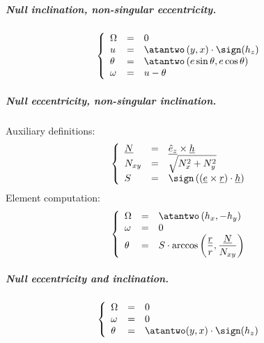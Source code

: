 		\subparagraph{ Null inclination, non-singular eccentricity. \\}
		\[
		\left\{
		\begin{array}{lll}
		\Omega 	& = & 0 \\
		u 		& = & \atantwo\left( y, x \right) \cdot \sign (h_z) \\
		\theta 	& = & \atantwo\left(e\sin\theta, e\cos\theta\right)\\
		\omega 	& = & u - \theta
		\end{array}\right.
		\]
		\subparagraph{ Null eccentricity, non-singular inclination. \\}
		\indent Auxiliary definitions:
		\[\left\{
		\begin{array}{lll}
		\underline{N} 	& = & \underline{\hat{e}_z} \times \underline{h} \\
		N_{xy} 			& = & \sqrt{N_x^2 + N_y^2} \\
		S 				& = & \sign\left( (\underline{e} \times\underline{r}) \cdot \underline{h} \right)
		\end{array}
		\right.
		\]
		\indent Element computation:
		\[
		\left\{
		\begin{array}{lll}
		\Omega 	& = & \atantwo\left( h_x, -h_y\right)\\
		\omega 	& = & 0 \\
		\theta 	& = & S \cdot \arccos\left( \dfrac{\underline{r}}{r}, \dfrac{\underline{N}}{N_{xy}} \right)\\
		\end{array}\right.
		\]
		\subparagraph{ Null eccentricity and inclination. \\}
		\[
		\left\{
		\begin{array}{lll}
		\Omega 	& = & 0 \\
		\omega 	& = & 0 \\
		\theta 	& = & \atantwo(y, x) \cdot \sign(h_z)\\
		\end{array}\right.
		\]
